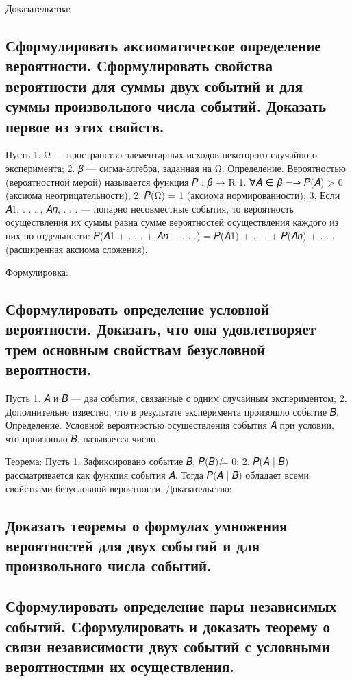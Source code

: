 Доказательства:

\subsection{Сформулировать аксиоматическое определение вероятности. Сформулировать свойства вероятности для суммы двух событий и для суммы произвольного числа событий. Доказать первое из этих свойств.}

Пусть 
1. Ω — пространство элементарных исходов некоторого случайного эксперимента;
2. 𝛽 — сигма-алгебра, заданная на Ω.
Определение. Вероятностью (вероятностной мерой) называется функция
𝑃 : 𝛽 → R
1. ∀𝐴 ∈ 𝛽 =⇒ 𝑃(𝐴) > 0 (аксиома неотрицательности); 
2. 𝑃(Ω) = 1 (аксиома нормированности); 
3. Если 𝐴1, . . . , 𝐴𝑛, . . . — попарно несовместные события, то вероятность осуществления их суммы равна сумме вероятностей осуществления каждого из них по отдельности: 𝑃(𝐴1 + . . . + 𝐴𝑛 + . . .) = 𝑃(𝐴1) + . . . + 𝑃(𝐴𝑛) + . . . (расширенная аксиома сложения).

Формулировка:

\subsection{Сформулировать определение условной вероятности. Доказать, что она удовлетворяет трем основным свойствам безусловной вероятности.}

Пусть
1. 𝐴 и 𝐵 — два события, связанные с одним случайным экспериментом;
2. Дополнительно известно, что в результате эксперимента произошло событие 𝐵.
Определение. Условной вероятностью осуществления события 𝐴 при условии, что произошло 𝐵, называется число

Теорема:
Пусть 
1. Зафиксировано событие 𝐵, 𝑃(𝐵) ̸= 0; 
2. 𝑃(𝐴 | 𝐵) рассматривается как функция события 𝐴. 
Тогда 𝑃(𝐴 | 𝐵) обладает всеми свойствами безусловной вероятности.
Доказательство:

\subsection{Доказать теоремы о формулах умножения вероятностей для двух событий и для произвольного числа событий.}
\subsection{Сформулировать определение пары независимых событий. Сформулировать и доказать теорему о связи независимости двух событий с условными вероятностями их осуществления.}

